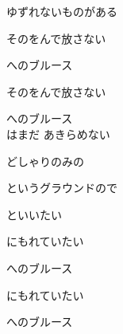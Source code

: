 {ゆずれないものがある

そのをんで放さない

へのブルース

そのをんで放さない

へのブルース
\\

はまだ あきらめない

どしゃりのみの

というグラウンドので

といいたい

にもれていたい

へのブルース

にもれていたい

へのブルース

}